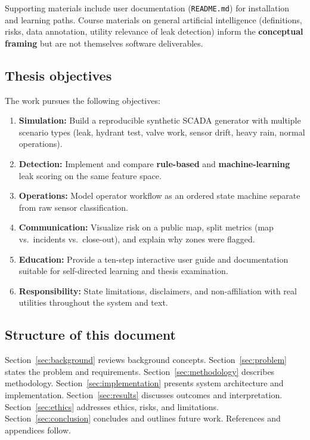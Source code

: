 \documentclass[12pt,a4paper]{article}
\begin{document}
Supporting materials include user documentation (\texttt{README.md}) for installation and learning paths. Course materials on general artificial intelligence (definitions, risks, data annotation, utility relevance of leak detection) inform the \textbf{conceptual framing} but are not themselves software deliverables.

\subsection{Thesis objectives}

The work pursues the following objectives:
\begin{enumerate}[label=\textbf{O\arabic*:}]
    \item \textbf{Simulation:} Build a reproducible synthetic SCADA generator with multiple scenario types (leak, hydrant test, valve work, sensor drift, heavy rain, normal operations).
    \item \textbf{Detection:} Implement and compare \textbf{rule-based} and \textbf{machine-learning} leak scoring on the same feature space.
    \item \textbf{Operations:} Model operator workflow as an ordered state machine separate from raw sensor classification.
    \item \textbf{Communication:} Visualize risk on a public map, split metrics (map vs.\ incidents vs.\ close-out), and explain why zones were flagged.
    \item \textbf{Education:} Provide a ten-step interactive user guide and documentation suitable for self-directed learning and thesis examination.
    \item \textbf{Responsibility:} State limitations, disclaimers, and non-affiliation with real utilities throughout the system and text.
\end{enumerate}

\subsection{Structure of this document}

Section~\ref{sec:background} reviews background concepts. Section~\ref{sec:problem} states the problem and requirements. Section~\ref{sec:methodology} describes methodology. Section~\ref{sec:implementation} presents system architecture and implementation. Section~\ref{sec:results} discusses outcomes and interpretation. Section~\ref{sec:ethics} addresses ethics, risks, and limitations. Section~\ref{sec:conclusion} concludes and outlines future work. References and appendices follow.
\end{document}
